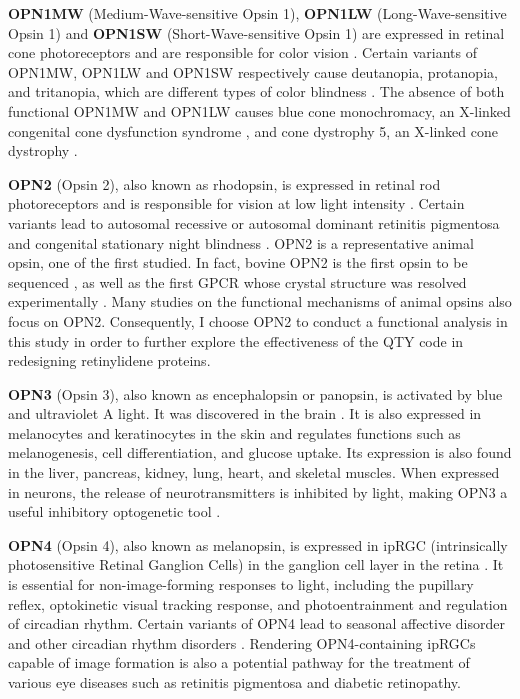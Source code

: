 \documentclass[fleqn, 10pt]{manuscript}
\begin{document}
\textbf{OPN1MW} (Medium-Wave-sensitive Opsin 1), \textbf{OPN1LW} (Long-Wave-sensitive Opsin 1) and \textbf{OPN1SW} (Short-Wave-sensitive Opsin 1) are expressed in retinal cone photoreceptors and are responsible for color vision \citep{Bowmaker_1980}. Certain variants of OPN1MW, OPN1LW and OPN1SW respectively cause deutanopia, protanopia, and tritanopia, which are different types of color blindness \citep{Ueyama_2002, Baraas_2012}. The absence of both functional OPN1MW and OPN1LW causes blue cone monochromacy, an X-linked congenital cone dysfunction syndrome \citep{Wissinger_2022}, and cone dystrophy 5, an X-linked cone dystrophy \citep{Gardner_2010}. 

\textbf{OPN2} (Opsin 2), also known as rhodopsin, is expressed in retinal rod photoreceptors and is responsible for vision at low light intensity \citep{Hubbard_1958}. Certain variants lead to autosomal recessive or autosomal dominant retinitis pigmentosa and congenital stationary night blindness \citep{Fanelli_2021}. OPN2 is a representative animal opsin, one of the first studied. In fact, bovine OPN2 is the first opsin to be sequenced \citep{Nathans_1984}, as well as the first GPCR whose crystal structure was resolved experimentally \citep{Palczeski_2000}. Many studies on the functional mechanisms of animal opsins also focus on OPN2. Consequently, I choose OPN2 to conduct a functional analysis in this study in order to further explore the effectiveness of the QTY code in redesigning retinylidene proteins. 

\textbf{OPN3} (Opsin 3), also known as encephalopsin or panopsin, is activated by blue and ultraviolet A light. It was discovered in the brain \citep{Blackshaw_1999}. It is also expressed in melanocytes and keratinocytes in the skin and regulates functions such as melanogenesis, cell differentiation, and glucose uptake. Its expression is also found in the liver, pancreas, kidney, lung, heart, and skeletal muscles. When expressed in neurons, the release of neurotransmitters is inhibited by light, making OPN3 a useful inhibitory optogenetic tool \citep{Copits_2021}. 

\textbf{OPN4} (Opsin 4), also known as melanopsin, is expressed in ipRGC (intrinsically photosensitive Retinal Ganglion Cells) in the ganglion cell layer in the retina \citep{Provencio_1998}. It is essential for non-image-forming responses to light, including the pupillary reflex, optokinetic visual tracking response, and photoentrainment and regulation of circadian rhythm. Certain variants of OPN4 lead to seasonal affective disorder and other circadian rhythm disorders \citep{Berson_2002}. Rendering OPN4-containing ipRGCs capable of image formation is also a potential pathway for the treatment of various eye diseases such as retinitis pigmentosa and diabetic retinopathy. 
\end{document}

